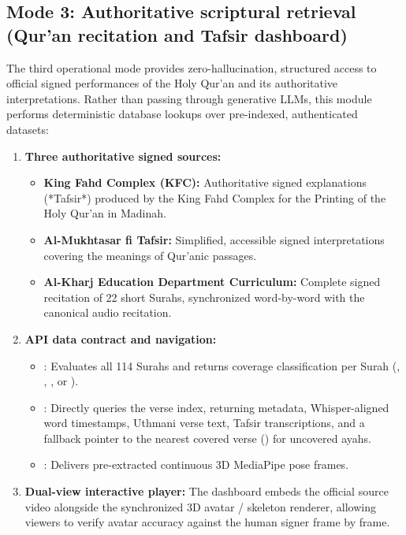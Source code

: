 \subsection{Mode 3: Authoritative scriptural retrieval (Qur'an recitation and Tafsir dashboard)}
\label{sec:mode_quran}
The third operational mode provides zero-hallucination, structured access to official signed performances of the Holy Qur'an and its authoritative interpretations. Rather than passing through generative LLMs, this module performs deterministic database lookups over pre-indexed, authenticated datasets:
\begin{enumerate}[leftmargin=*,itemsep=2pt]
  \item \textbf{Three authoritative signed sources:}
    \begin{itemize}[leftmargin=*,itemsep=1pt]
      \item \textbf{King Fahd Complex (KFC):} Authoritative signed explanations (*Tafsir*) produced by the King Fahd Complex for the Printing of the Holy Qur'an in Madinah.
      \item \textbf{Al-Mukhtasar fi Tafsir:} Simplified, accessible signed interpretations covering the meanings of Qur'anic passages.
      \item \textbf{Al-Kharj Education Department Curriculum:} Complete signed recitation of 22 short Surahs, synchronized word-by-word with the canonical audio recitation.
    \end{itemize}
  \item \textbf{API data contract and navigation:}
    \begin{itemize}[leftmargin=*,itemsep=1pt]
      \item {}: Evaluates all 114 Surahs and returns coverage classification per Surah (, , , or ).
      \item {}: Directly queries the verse index, returning metadata, Whisper-aligned word timestamps, Uthmani verse text, Tafsir transcriptions, and a fallback pointer to the nearest covered verse () for uncovered ayahs.
      \item {}: Delivers pre-extracted continuous 3D MediaPipe pose frames.
    \end{itemize}
  \item \textbf{Dual-view interactive player:} The dashboard embeds the official source video alongside the synchronized 3D avatar / skeleton renderer, allowing viewers to verify avatar accuracy against the human signer frame by frame.
\end{enumerate}

